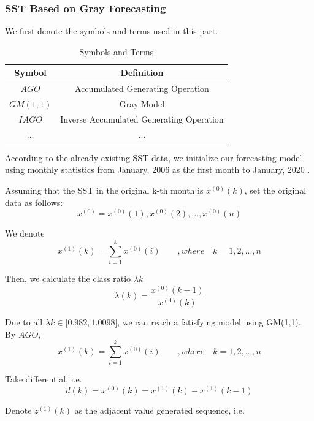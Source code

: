 \documentclass{mcmthesis}
\begin{document}
\subsubsection{SST Based on Gray Forecasting}\label{S4ss1}
	We first denote the symbols and terms used in this part.
\begin{table}[H]\small
    \centering
    \caption{Symbols and Terms}
    \label{symbol}
    \begin{tabular}{c c}
\toprule[2pt]
        Symbol & Definition\\
\hline
    $AGO$ & Accumulated Generating Operation\\
    $GM(1,1)$ & Gray Model\\
    $IAGO$ & Inverse Accumulated Generating Operation\\
    $...$ & ...\\
\bottomrule[2pt]
    \end{tabular}
\end{table}
	According to the already existing SST data, we initialize our forecasting model using monthly statistics from January, 2006 as the first month to January, 2020 .\par
	Assuming that the SST in the original k-th month is $x^{(0)}(k)$, set the original data as follows:
\begin{equation*}
	x^{(0)} = x^{(0)}(1), x^{(0)}(2), ..., x^{(0)}(n)
\end{equation*}\par
	We denote
\begin{equation*}
	x^{(1)}(k) =  \sum_{i=1}^kx^{(0)}(i) \qquad  ,where\quad k = 1, 2, ..., n
\end{equation*}\par
	Then, we calculate the class ratio $\lambda{k}$
\begin{equation*}
	\lambda(k) =  \frac{x^{(0)}(k-1)}{x^{(0)}(k)}
\end{equation*}\par
	Due to all $\lambda k \in \big[0.982, 1.0098\big]$, we can reach a fatisfying model using GM(1,1).
	By $AGO$, 
\begin{equation*}
	x^{(1)}(k) =  \sum_{i=1}^kx^{(0)}(i) \qquad  ,where\quad k = 1, 2, ..., n
\end{equation*}\par
	Take differential, i.e.
\begin{equation*}
	d(k) = x^{(0)}(k) = x^{(1)}(k) - x^{(1)}(k-1)
\end{equation*}\par
	Denote $z^{(1)}(k)$ as the adjacent value generated sequence, i.e.
\end{document}
